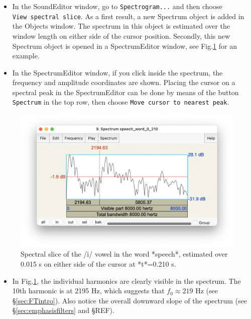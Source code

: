 \documentclass[
]{book}
\providecommand{\tightlist}{%
  \setlength{\itemsep}{0pt}\setlength{\parskip}{0pt}}
\begin{document}
\begin{itemize}
\item
  In the SoundEditor window, go to \texttt{Spectrogram...} and then choose \texttt{View\ spectral\ slice}. As a first result, a new Spectrum object is added in the Objects window. The spectrum in this object is estimated over the window length on either side of the cursor position. Secondly, this new Spectrum object is opened in a SpectrumEditor window, see Fig.\ref{fig:speech-spectralslice} for an example.
\item
  In the SpectrumEditor window, if you click inside the spectrum, the frequency and amplitude coordinates are shown. Placing the cursor on a spectral peak in the SpectrumEditor can be done by means of the button \texttt{Spectrum} in the top row, then choose \texttt{Move\ cursor\ to\ nearest\ peak}.
\end{itemize}

\begin{figure}

{\centering \includegraphics{figures/Spectrum_speech_word_0_210} 

}

\caption{Spectral slice of the /i/ vowel in the word *speech*, estimated over 0.015 s on either side of the cursor at *t*=0.210 s. }\label{fig:speech-spectralslice}
\end{figure}

\begin{itemize}
\tightlist
\item
  In Fig.\ref{fig:speech-spectralslice}, the individual harmonics are clearly visible in the spectrum. The 10th harmonic is at 2195 Hz, which suggests that \(f_0 \approx 219\) Hz (see §\ref{sec:FTintro}). Also notice the overall downward slope of the spectrum (see §\ref{sec:emphasisfilters} and §REF).
\end{itemize}
\end{document}
